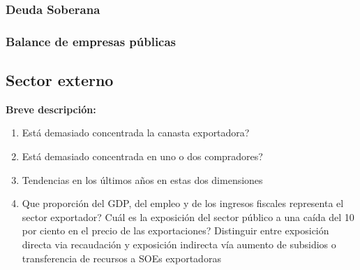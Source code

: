 \documentclass[12pt,a4paper]{article}
\begin{document}
\subsubsection{Deuda Soberana}

\subsubsection{Balance de empresas públicas}




\vspace{0.5cm}

\vspace{0.5cm}
\subsection{Sector externo}
\textbf{Breve descripción:} \newline

\begin{enumerate}
	\item Está demasiado concentrada la canasta exportadora?
	\item Está demasiado concentrada en uno o dos compradores?
	\item Tendencias en los últimos años en estas dos dimensiones
	\item Que proporción del GDP, del empleo y de los ingresos fiscales representa el sector exportador? Cuál es la exposición del sector público a una caída del 10 por ciento en el precio de las exportaciones? Distinguir entre exposición directa via recaudación y exposición indirecta vía aumento de subsidios o transferencia de recursos a SOEs exportadoras
\end{enumerate}
\end{document}
